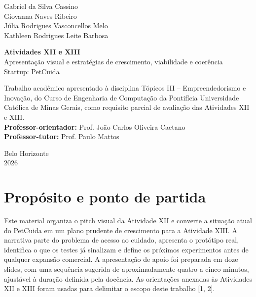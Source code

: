 \documentclass[12pt,a4paper]{article}
\begin{document}
\begin{titlepage}
\thispagestyle{empty}
\begin{center}
{\large Gabriel da Silva Cassino}\\
{\large Giovanna Naves Ribeiro}\\
{\large Júlia Rodrigues Vasconcellos Melo}\\
{\large Kathleen Rodrigues Leite Barbosa}

\vfill
{\Large\textbf{Atividades XII e XIII}}\\[0.25cm]
{\large Apresentação visual e estratégias de crescimento, viabilidade e coerência}\\[0.25cm]
{\large Startup: PetCuida}
\end{center}
\vfill
\begin{flushright}
\begin{minipage}{8.2cm}
\small\singlespacing
Trabalho acadêmico apresentado à disciplina Tópicos III -- Empreendedorismo e Inovação, do Curso de Engenharia de Computação da Pontifícia Universidade Católica de Minas Gerais, como requisito parcial de avaliação das Atividades XII e XIII.\\[0.35cm]
\textbf{Professor-orientador:} Prof. João Carlos Oliveira Caetano\\
\textbf{Professor-tutor:} Prof. Paulo Mattos
\end{minipage}
\end{flushright}
\vfill
\begin{center}Belo Horizonte\\2026\end{center}
\end{titlepage}

\tableofcontents
\clearpage
{}

\section{Propósito e ponto de partida}

Este material organiza o pitch visual da Atividade XII e converte a situação atual do PetCuida em um plano prudente de crescimento para a Atividade XIII. A narrativa parte do problema de acesso ao cuidado, apresenta o protótipo real, identifica o que os testes já sinalizam e define os próximos experimentos antes de qualquer expansão comercial. A apresentação de apoio foi preparada em doze slides, com uma sequência sugerida de aproximadamente quatro a cinco minutos, ajustável à duração definida pela docência. As orientações anexadas às Atividades XII e XIII foram usadas para delimitar o escopo deste trabalho [1, 2].
\end{document}
